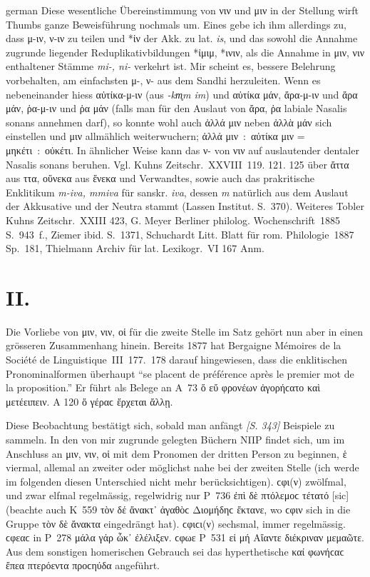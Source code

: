 \begin{otherlanguage*}{german}
Diese wesentliche Übereinstimmung von νιν und μιν in der Stellung wirft Thumbs ganze Beweisführung nochmals um. Eines gebe ich ihm allerdings zu, dass μ-ιν, ν-ιν zu teilen und *ἰν der Akk. zu lat. \emph{is}, und das sowohl die Annahme zugrunde liegender Reduplikativbildungen *ἰμιμ, *ινιν, als die Annahme in μιν, νιν enthaltener Stämme \emph{mi-, ni-} verkehrt ist. Mir scheint es, bessere Belehrung vorbehalten, am einfachsten μ-, ν- aus dem Sandhi herzuleiten. Wenn es nebeneinander hiess αὐτίκα-μ-ιν (aus \emph{-km̥m im}) und αὐτίκα μάν, ἄρα-μ-ιν und ἄρα μάν, ῥα-μ-ιν und ῥα μάν (falls man für den Auslaut von ἄρα, ῥα labiale Nasalis sonans annehmen darf), so konnte wohl auch ἀλλά μιν neben ἀλλὰ μάν sich einstellen und μιν allmählich weiterwuchern; ἀλλά μιν~:~αὐτίκα μιν = μηκέτι~:~οὐκέτι. In ähnlicher Weise kann das ν- von νιν auf auslautender dentaler Nasalis sonans beruhen. Vgl. Kuhns Zeitschr.~XXVIII~119. 121. 125 über ἄττα aus ττα, οὕνεκα aus ἕνεκα und Verwandtes, sowie auch das prakritische Enklitikum \emph{m-iva, mmiva} für sanskr. \emph{iva}, dessen \emph{m} natürlich aus dem Auslaut der Akkusative und der Neutra stammt (Lassen Institut. S.~370). Weiteres Tobler Kuhns Zeitschr.~XXIII 423, G. Meyer Berliner philolog. Wochenschrift~1885 S.~943~f., Ziemer ibid. S.~1371, Schuchardt Litt. Blatt für rom. Philologie~1887 Sp.~181, Thielmann Archiv für lat. Lexikogr.~VI 167 Anm.

\section*{II.}

Die Vorliebe von μιν, νιν, οἱ für die zweite Stelle im Satz gehört nun aber in einen grösseren Zusammenhang hinein. Bereits 1877 hat Bergaigne Mémoires de la Société de Linguistique~III~177.~178 darauf hingewiesen, dass die enklitischen Pronominalformen überhaupt “se placent de préférence après le premier mot de la proposition.” Er führt als Belege an Α~73 ὅ  εὔ φρονέων ἀγορήϲατο καὶ μετέειπειν. Α 120 ὅ  γέραϲ ἔρχεται ἄλλῃ.

Diese Beobachtung bestätigt sich, sobald man anfängt \hypertarget{p343}{\emph{[S. 343]}}\label{p343} Beispiele zu sammeln. In den von mir zugrunde gelegten Büchern ΝΠΡ findet sich, um im Anschluss an μιν, νιν, οἱ mit dem Pronomen der dritten Person zu beginnen, ἑ viermal, allemal an zweiter oder möglichst nahe bei der zweiten Stelle (ich werde im folgenden diesen Unterschied nicht mehr berücksichtigen). ϲφι(ν) zwölfmal, und zwar elfmal regelmässig, regelwidrig nur Ρ~736 ἐπὶ δὲ πτόλεμοϲ τέτατό  [sic] (beachte auch Κ~559 τὸν δέ  ἄνακτ᾽ ἀγαθὸϲ Διομήδηϲ ἔκτανε, wo ϲφιν sich in die Gruppe τὸν δὲ ἄνακτα eingedrängt hat). ϲφιϲι(ν) sechsmal, immer regelmässig. ϲφεαϲ in Ρ~278 μάλα γάρ  ὦκ᾽ ἐλέλιξεν. ϲφωε Ρ~531 εἰ μή  Αἴαντε διέκριναν μεμαῶτε. Aus dem sonstigen homerischen Gebrauch sei das hyperthetische καί  φωνήϲαϲ ἔπεα πτερόεντα προϲηύδα angeführt.


\end{otherlanguage*}
